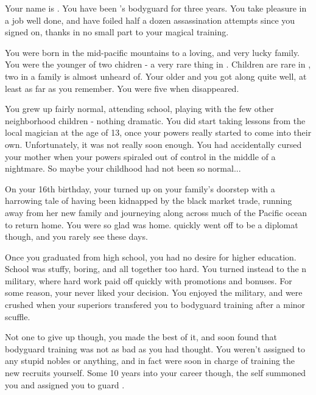 \documentclass[char]{NeptuneBall}
\begin{document}
\name{\cBodyguard{}}

Your name is \cBodyguard{}. You have been \cPrince{}'s bodyguard for three years. You take pleasure in a job well done, and have foiled half a dozen assassination attempts since you signed on, thanks in no small part to your magical training.

You were born in the mid-pacific mountains to a loving, and very lucky family. You were the younger of two chidren - a very rare thing in \pPacifica{}. Children are rare in \pPacifica{}, two in a family is almost unheard of. Your older \cSpy{\sibling} \cSpy{} and you got along quite well, at least as far as you remember. You were five when \cSpy{\they} disappeared. 

You grew up fairly normal, attending school, playing with the few other neighborhood children - nothing dramatic. You did start taking lessons from the local magician at the age of 13, once your powers really started to come into their own. Unfortunately, it was not really soon enough.  You had accidentally cursed your mother when your powers spiraled out of control in the middle of a nightmare. So maybe your childhood had not been so normal...

On your 16th birthday, your \cSpy{\sibling} turned up on your family's doorstep with a harrowing tale of having been kidnapped by the black market trade, running away from her new family and journeying along across much of the Pacific ocean to return home. You were so glad \cSpy{\they} was home. \cSpy{\They} quickly went off to be a diplomat though, and you rarely see \cSpy{\them} these days.

Once you graduated from high school, you had no desire for higher education. School was stuffy, boring, and all together too hard. You turned instead to the \pPacifica{}n military, where hard work paid off quickly with promotions and bonuses. For some reason, your \cSpy{\sibling} never liked your decision. You enjoyed the military, and were crushed when your superiors transfered you to bodyguard training after a minor scuffle.

Not one to give up though, you made the best of it, and soon found that bodyguard training was not as bad as you had thought. You weren't assigned to any stupid nobles or anything, and in fact were soon in charge of training the new recruits yourself. Some 10 years into your career though, the \cPacificanRuler{\King} \cPacificanRuler{\them}self summoned you and assigned you to guard \cPacificanRuler{\them} \cPrince{\offspring} \cPrince{}.
\end{document}

